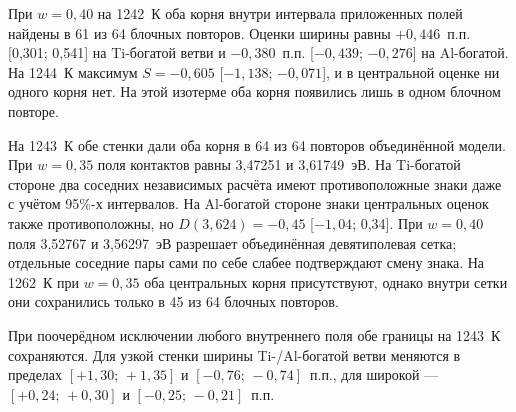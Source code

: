 При \(w=0{,}40\) на 1242~К оба корня внутри интервала приложенных полей найдены в 61 из 64 блочных повторов. Оценки ширины равны \(+0{,}446\)~п.п. [0,301; 0,541] на Ti-богатой ветви и \(-0{,}380\)~п.п. [\(-0{,}439\); \(-0{,}276\)] на Al-богатой. На 1244~К максимум \(S=-0{,}605\) [\(-1{,}138\); \(-0{,}071\)], и в центральной оценке ни одного корня нет. На этой изотерме оба корня появились лишь в одном блочном повторе.

На 1243~К обе стенки дали оба корня в 64 из 64 повторов объединённой модели. При \(w=0{,}35\) поля контактов равны 3,47251 и 3,61749~эВ. На Ti-богатой стороне два соседних независимых расчёта имеют противоположные знаки даже с учётом 95\%-х интервалов. На Al-богатой стороне знаки центральных оценок также противоположны, но \(D(3{,}624)=-0{,}45\) [\(-1{,}04\); 0,34]. При \(w=0{,}40\) поля 3,52767 и 3,56297~эВ разрешает объединённая девятиполевая сетка; отдельные соседние пары сами по себе слабее подтверждают смену знака. На 1262~К при \(w=0{,}35\) оба центральных корня присутствуют, однако внутри сетки они сохранились только в 45 из 64 блочных повторов.

При поочерёдном исключении любого внутреннего поля обе границы на 1243~К сохраняются. Для узкой стенки ширины Ti-/Al-богатой ветви меняются в пределах \([+1{,}30;\,+1{,}35]\) и \([-0{,}76;\,-0{,}74]\)~п.п., для широкой --- \([+0{,}24;\,+0{,}30]\) и \([-0{,}25;\,-0{,}21]\)~п.п.